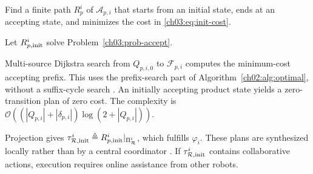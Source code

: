 \begin{problem}
\label{ch03:prob-accept}
Find a finite path $R_p^i$ of $\mathcal{A}_{p,i}$ that starts from an initial
state, ends at an accepting state, and minimizes the cost in
\eqref{ch03:eq:init-cost}.
\end{problem}

Let $R_{p,\textup{init}}^i$ solve Problem~\ref{ch03:prob-accept}.
\begin{revision}
Multi-source Dijkstra search from $Q_{p,i,0}$ to $\mathcal{F}_{p,i}$ computes
the minimum-cost accepting prefix. This uses the prefix-search part of
Algorithm~\ref{ch02:alg:optimal}, without a suffix-cycle search
\citep{guo2013motion,lavalle2006planning,korf1987planning}.
An initially accepting product state yields a zero-transition plan of zero cost.
The complexity is
$\mathcal{O}((|Q_{p,i}|+|\delta_{p,i}|)\log(2+|Q_{p,i}|))$.
\end{revision}
Projection gives
$\tau_{\mathcal{R},\textup{init}}^i \triangleq
R_{p,\textup{init}}^i|_{\Pi_{\mathcal{R}}^i}$, which fulfills $\varphi_i$.
These plans are synthesized locally rather than by a central coordinator
\citep{chen2012formal,guo2012infeasible}. If
$\tau_{\mathcal{R},\textup{init}}^i$ contains collaborative actions, execution
requires online assistance from other robots.

